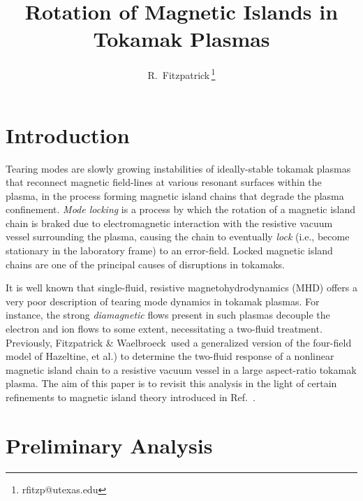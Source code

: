 \documentclass[12pt,prb,aps]{revtex4-1}
\begin{document}
\title{Rotation of Magnetic Islands in Tokamak Plasmas}

\author{R.~Fitzpatrick\,\footnote{rfitzp@utexas.edu}}

\begin{abstract}
\end{abstract}

\maketitle

\section{Introduction}
Tearing modes are slowly growing instabilities of ideally-stable tokamak plasmas that reconnect magnetic field-lines
at various resonant surfaces within the plasma, in the process forming magnetic island chains that degrade the plasma confinement.\cite{wes} {\em Mode locking}\/ is a process by which the rotation of a magnetic island chain is braked  due to electromagnetic interaction with the resistive 
vacuum vessel surrounding the plasma, causing the chain to eventually {\em lock}\/ (i.e., become stationary in the laboratory frame) to an error-field.\cite{nave}
 Locked magnetic island chains are one of the principal causes of disruptions in tokamaks.\cite{vries}
 
It is well known that single-fluid, resistive magnetohydrodynamics (MHD) offers a very poor description of
tearing mode dynamics in tokamak plasmas. 
For instance, the strong {\em diamagnetic}\/ flows present in such plasmas decouple the electron and ion flows to some extent,
necessitating a two-fluid treatment.\cite{ara} Previously, Fitzpatrick \& Waelbroeck\,\cite{fw,fw1} used a generalized version of the four-field model of Hazeltine, et al.\cite{haz})
to determine the two-fluid response of a nonlinear magnetic island chain to a resistive vacuum vessel  in a large aspect-ratio tokamak plasma. The aim of this paper is to revisit this analysis in the light of certain refinements to magnetic island theory
introduced in Ref.~. 

\section{Preliminary Analysis}\label{sect1}
\end{document}
